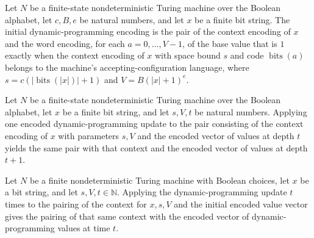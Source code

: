 \begin{theorem}
\label{Randomized.BPLInP.dpInit_eq}
\leanok
{}
Let $N$ be a finite-state nondeterministic Turing machine over the Boolean alphabet, let
$c,B,e$ be natural numbers, and let $x$ be a finite bit string. The initial
dynamic-programming encoding is the pair of the context encoding of $x$ and the word
encoding, for each $a=0,\ldots,V-1$, of the base value that is $1$ exactly when the
context encoding of $x$ with space bound $s$ and code $\operatorname{bits}(a)$ belongs
to the machine's accepting-configuration language, where
$s=c(|\operatorname{bits}(|x|)|+1)$ and $V=B(|x|+1)^e$.
\end{theorem}

\begin{theorem}
\label{Randomized.BPLInP.dpStep_eq}
\leanok
{}
Let $N$ be a finite-state nondeterministic Turing machine over the Boolean alphabet, let
$x$ be a finite bit string, and let $s,V,t$ be natural numbers. Applying one encoded
dynamic-programming update to the pair consisting of the context encoding of $x$ with
parameters $s,V$ and the encoded vector of values at depth $t$ yields the same pair with
that context and the encoded vector of values at depth $t+1$.
\end{theorem}

\begin{theorem}
\label{Randomized.BPLInP.iterate_dpStep}
\leanok
{}
Let $N$ be a finite nondeterministic Turing machine with Boolean choices, let $x$ be a
bit string, and let $s,V,t\in\mathbb N$. Applying the dynamic-programming update $t$
times to the pairing of the context for $x,s,V$ and the initial encoded value vector
gives the pairing of that same context with the encoded vector of dynamic-programming
values at time $t$.
\end{theorem}

